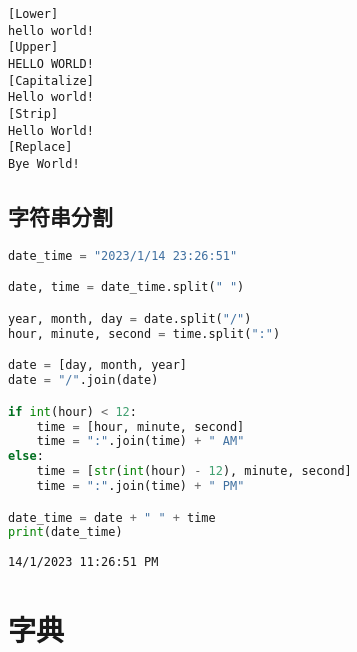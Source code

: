 \begin{tcolorbox}
	\begin{verbatim}
[Lower]
hello world!
[Upper]     
HELLO WORLD!
[Capitalize]
Hello world!
[Strip]     
Hello World!
[Replace]
Bye World!
\end{verbatim}
\end{tcolorbox}

\vspace{0.5cm}

\subsection{字符串分割}

\begin{table}[H]
	\centering
\end{table}


\begin{lstlisting}[language=Python]
date_time = "2023/1/14 23:26:51"

date, time = date_time.split(" ")

year, month, day = date.split("/")
hour, minute, second = time.split(":")

date = [day, month, year]
date = "/".join(date)

if int(hour) < 12:
	time = [hour, minute, second]
	time = ":".join(time) + " AM"
else:
	time = [str(int(hour) - 12), minute, second]
	time = ":".join(time) + " PM"

date_time = date + " " + time
print(date_time)
\end{lstlisting}

\begin{tcolorbox}
	\begin{verbatim}
14/1/2023 11:26:51 PM
\end{verbatim}
\end{tcolorbox}

\newpage

\section{字典}

